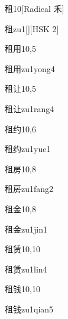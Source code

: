\begin{entry}{租}{10}[Radical 禾]
  \begin{phonetics}{租}{zu1}[][HSK 2]
  \end{phonetics}
\end{entry}

\begin{entry}{租用}{10,5}
  \begin{phonetics}{租用}{zu1yong4}
  \end{phonetics}
\end{entry}

\begin{entry}{租让}{10,5}
  \begin{phonetics}{租让}{zu1rang4}
  \end{phonetics}
\end{entry}

\begin{entry}{租约}{10,6}
  \begin{phonetics}{租约}{zu1yue1}
  \end{phonetics}
\end{entry}

\begin{entry}{租房}{10,8}
  \begin{phonetics}{租房}{zu1fang2}
  \end{phonetics}
\end{entry}

\begin{entry}{租金}{10,8}
  \begin{phonetics}{租金}{zu1jin1}
  \end{phonetics}
\end{entry}

\begin{entry}{租赁}{10,10}
  \begin{phonetics}{租赁}{zu1lin4}
  \end{phonetics}
\end{entry}

\begin{entry}{租钱}{10,10}
  \begin{phonetics}{租钱}{zu1qian5}
  \end{phonetics}
\end{entry}

